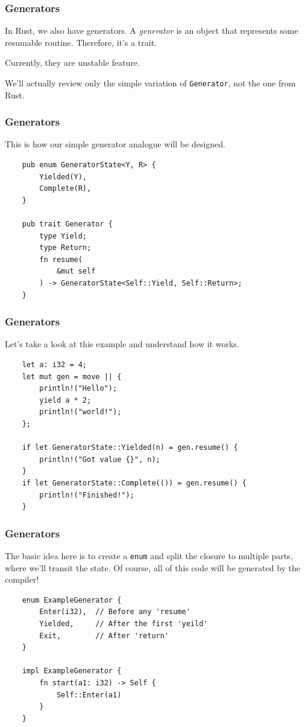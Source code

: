 \documentclass[aspectratio=1610,t]{beamer}
\begin{document}
\begin{frame}[fragile]
\frametitle{Generators}
In Rust, we also have generators. A \textit{generator} is an object that represents some resumable routine. Therefore, it's a trait.

Currently, they are unstable feature.

We'll actually review only the simple variation of \texttt{Generator}, not the one from Rust.
\end{frame}


\begin{frame}[fragile]
\frametitle{Generators}
This is how our simple generator analogue will be designed.

\begin{verbatim}
    pub enum GeneratorState<Y, R> {
        Yielded(Y),
        Complete(R),
    }

    pub trait Generator {
        type Yield;
        type Return;
        fn resume(
            &mut self
        ) -> GeneratorState<Self::Yield, Self::Return>;
    }
\end{verbatim}
\end{frame}


\begin{frame}[fragile]
\frametitle{Generators}
Let's take a look at this example and understand how it works.

\begin{verbatim}
    let a: i32 = 4;
    let mut gen = move || {
        println!("Hello");
        yield a * 2;
        println!("world!");
    };

    if let GeneratorState::Yielded(n) = gen.resume() {
        println!("Got value {}", n);
    }
    if let GeneratorState::Complete(()) = gen.resume() {
        println!("Finished!");
    }
\end{verbatim}
\end{frame}


\begin{frame}[fragile]
\frametitle{Generators}
The basic idea here is to create a \texttt{enum} and split the closure to multiple parts, where we'll transit the state. Of course, all of this code will be generated by the compiler!

\begin{verbatim}
    enum ExampleGenerator {
        Enter(i32),  // Before any 'resume'
        Yielded,     // After the first 'yeild'
        Exit,        // After 'return'
    }

    impl ExampleGenerator {
        fn start(a1: i32) -> Self {
            Self::Enter(a1)
        }
    }
\end{verbatim}
\end{frame}
\end{document}
